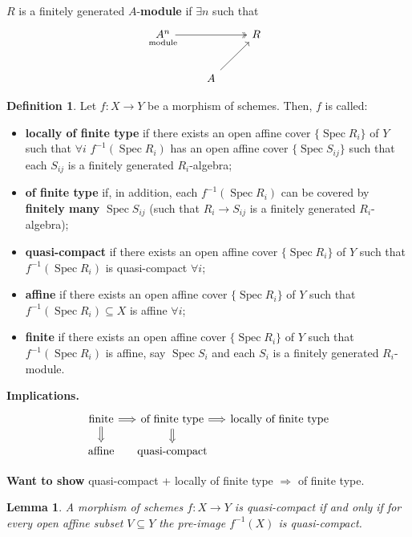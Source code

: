 \documentclass[12pt]{article}
\DeclareMathOperator{\Spec}{Spec}
\newtheorem{lemma+}{Lemma}
\theoremstyle{definition}
\newtheorem*{definition}{Definition}
\begin{document}
$R$ is a finitely generated $A$-\textbf{module} if $\exists n$ such that
\[\begin{tikzcd}\underset{\mathclap{\text{module}}}{A^n}\arrow[rr,two heads]&&R\\&A\arrow[ru]\end{tikzcd}\]

\begin{definition}
Let $f:X\rightarrow Y$ be a morphism of schemes. Then, $f$ is called:
\begin{itemize}
\item \textbf{locally of finite type} if there exists an open affine cover $\{\Spec R_i\}$ of $Y$ such that $\forall i$ $f^{-1}(\Spec R_i)$ has an open affine cover $\{\Spec S_{ij}\}$ such that each $S_{ij}$ is a finitely generated $R_i$-algebra;
\item \textbf{of finite type} if, in addition, each $f^{-1}(\Spec R_i)$ can be covered by \textbf{finitely many} $\Spec S_{ij}$ (such that $R_i\rightarrow S_{ij}$ is a finitely generated $R_i$-algebra);
\item \textbf{quasi-compact} if there exists an open affine cover $\{\Spec R_i\}$ of $Y$ such that $f^{-1}(\Spec R_i)$ is quasi-compact $\forall i$;
\item \textbf{affine} if there exists an open affine cover $\{\Spec R_i\}$ of $Y$ such that $f^{-1}(\Spec R_i)\subseteq X$ is affine $\forall i$;
\item \textbf{finite} if there exists an open affine cover $\{\Spec R_i\}$ of $Y$ such that $f^{-1}(\Spec R_i)$ is affine, say $\Spec S_i$ and each $S_i$ is a finitely generated $R_i$-module.
\end{itemize}
\end{definition}

\textbf{Implications.}
\[\begin{tikzcd}[column sep=small]\text{finite}\arrow[r,Rightarrow]\arrow[d,Rightarrow]&\text{of finite type}\arrow[r,Rightarrow]\arrow[d,Rightarrow]&\text{locally of finite type}\\[-0.2cm]\text{affine}&\text{quasi-compact}\end{tikzcd}\]

\textbf{Want to show} quasi-compact + locally of finite type $\Longrightarrow$ of finite type.

\begin{lemma+}\label{preimage_qcompact}
A morphism of schemes $f:X\rightarrow Y$ is quasi-compact if and only if for every open affine subset $V\subseteq Y$ the pre-image $f^{-1}(X)$ is quasi-compact.
\end{lemma+}
\end{document}

